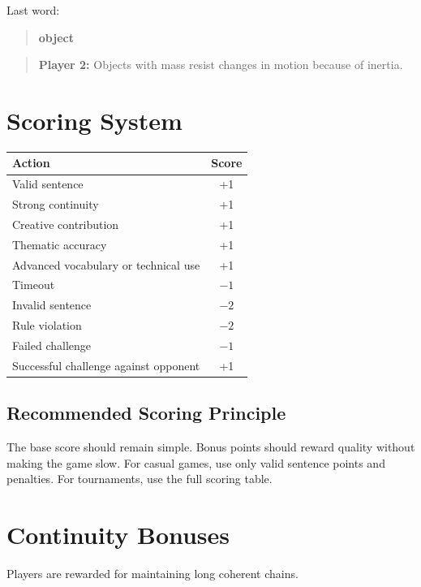 \documentclass[11pt,a4paper]{article}
\begin{document}
Last word:

\begin{quote}
\textbf{object}
\end{quote}

\begin{quote}
\textbf{Player 2:} Objects with mass resist changes in motion because of inertia.
\end{quote}

\section{Scoring System}

\begin{center}
\begin{tabular}{lc}
\toprule
\textbf{Action} & \textbf{Score} \\
\midrule
Valid sentence & +1 \\
Strong continuity & +1 \\
Creative contribution & +1 \\
Thematic accuracy & +1 \\
Advanced vocabulary or technical use & +1 \\
Timeout & $-1$ \\
Invalid sentence & $-2$ \\
Rule violation & $-2$ \\
Failed challenge & $-1$ \\
Successful challenge against opponent & +1 \\
\bottomrule
\end{tabular}
\end{center}

\subsection{Recommended Scoring Principle}

The base score should remain simple. Bonus points should reward quality without making the game slow. For casual games, use only valid sentence points and penalties. For tournaments, use the full scoring table.

\section{Continuity Bonuses}

Players are rewarded for maintaining long coherent chains.
\end{document}
